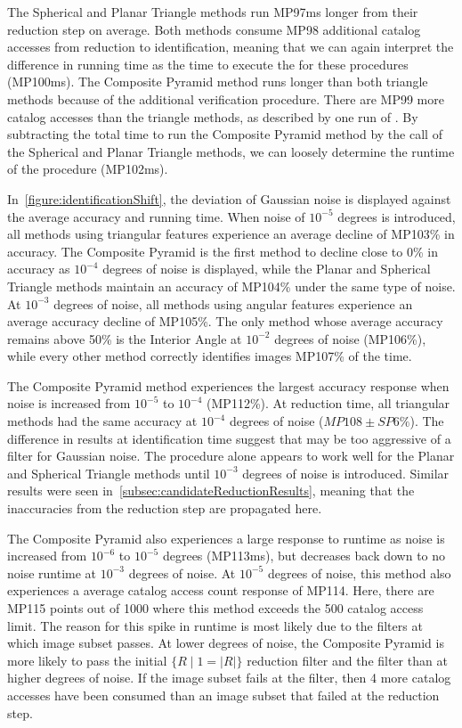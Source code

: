 The Spherical and Planar Triangle methods run MP97ms longer from their reduction step on average.
Both methods consume MP98 additional catalog accesses from reduction to identification, meaning that we can again
interpret the difference in running time as the time to execute the  for these procedures (MP100ms).
The Composite Pyramid method runs longer than both triangle methods because of the additional verification
procedure.
There are MP99 more catalog accesses than the triangle methods, as described by one run of .
By subtracting the total time to run the Composite Pyramid method by the  call of the Spherical and
Planar Triangle methods, we can loosely determine the runtime of the  procedure (MP102ms).

In~\autoref{figure:identificationShift}, the deviation of Gaussian noise is displayed against the average accuracy and
running time.
When noise of $10^{-5}$ degrees is introduced, all methods using triangular features experience an average decline of
MP103\% in accuracy.
The Composite Pyramid is the first method to decline close to 0\% in accuracy as $10^{-4}$ degrees of noise is
displayed, while the Planar and Spherical Triangle methods maintain an accuracy of MP104\% under the same type of noise.
At $10^{-3}$ degrees of noise, all methods using angular features experience an average accuracy decline of MP105\%.
The only method whose average accuracy remains above 50\% is the Interior Angle at $10^{-2}$ degrees of noise (MP106\%),
while every other method correctly identifies images MP107\% of the time.

The Composite Pyramid method experiences the largest accuracy response when noise is increased from $10^{-5}$ to
$10^{-4}$ (MP112\%).
At reduction time, all triangular methods had the same accuracy at $10^{-4}$ degrees of noise ($MP108 \pm SP6\%$).
The difference in results at identification time suggest that  may be too aggressive of a filter for
Gaussian noise.
The  procedure alone appears to work well for the Planar and Spherical Triangle methods until $10^{-3}$
degrees of noise is introduced.
Similar results were seen in~\autoref{subsec:candidateReductionResults}, meaning that the inaccuracies from the
reduction step are propagated here.

The Composite Pyramid also experiences a large response to runtime as noise is increased from $10^{-6}$ to $10^{-5}$
degrees (MP113ms), but decreases back down to no noise runtime at $10^{-3}$ degrees of noise.
At $10^{-5}$ degrees of noise, this method also experiences a average catalog access count response of MP114.
Here, there are MP115 points out of 1000 where this method exceeds the 500 catalog access limit.
The reason for this spike in runtime is most likely due to the filters at which image subset passes.
At lower degrees of noise, the Composite Pyramid is more likely to pass the initial $\{ R \mid 1 = |R| \}$ reduction filter
and the  filter than at higher degrees of noise.
If the image subset fails at the  filter, then 4 more catalog accesses have been consumed than an image
subset that failed at the reduction step.

